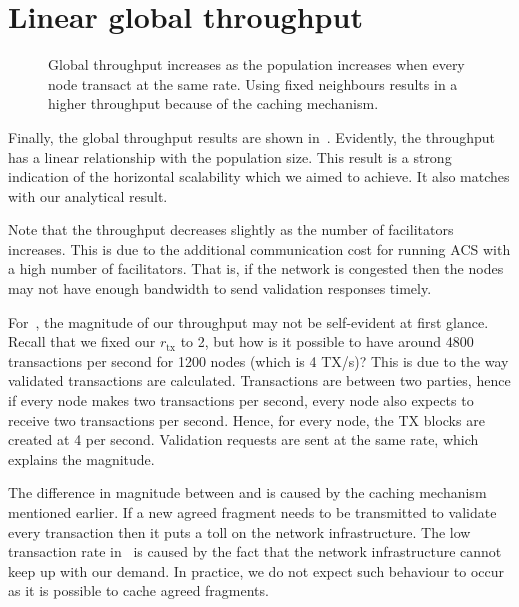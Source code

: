 \section{Linear global throughput}
\begin{figure}[h]
  \centering
  \caption{Global throughput increases as the population increases when every node transact at the same rate.
  Using fixed neighbours results in a higher throughput because of the caching mechanism.}
  \label{fig:global-throughput}
\end{figure}


Finally, the global throughput results are shown in~.
Evidently, the throughput has a linear relationship with the population size.
This result is a strong indication of the horizontal scalability which we aimed to achieve.
It also matches with our analytical result.

Note that the throughput decreases slightly as the number of facilitators increases.
This is due to the additional communication cost for running ACS with a high number of facilitators.
That is, if the network is congested then the nodes may not have enough bandwidth to send validation responses timely.

For~,
the magnitude of our throughput may not be self-evident at first glance.
Recall that we fixed our $r_\text{tx}$ to 2, but how is it possible to have around 4800 transactions per second for 1200 nodes (which is 4 TX/s)?
This is due to the way validated transactions are calculated.
Transactions are between two parties, hence if every node makes two transactions per second,
every node also expects to receive two transactions per second.
Hence, for every node, the TX blocks are created at 4 per second.
Validation requests are sent at the same rate, which explains the magnitude.

The difference in magnitude between  and  is caused by the caching mechanism mentioned earlier.
If a new agreed fragment needs to be transmitted to validate every transaction then it puts a toll on the network infrastructure.
The low transaction rate in~ is caused by the fact that the network infrastructure cannot keep up with our demand.
In practice, we do not expect such behaviour to occur as it is possible to cache agreed fragments.

